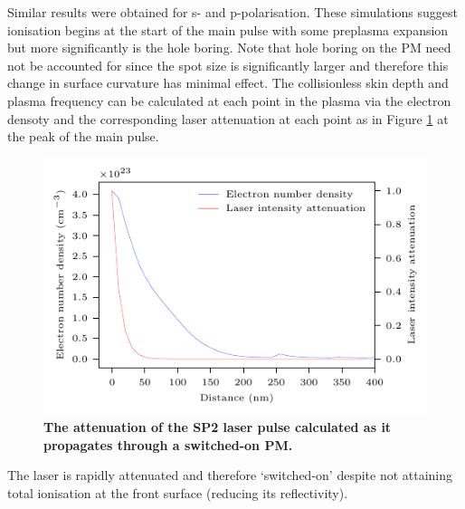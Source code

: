 Similar results were obtained for s- and p-polarisation. These simulations suggest ionisation begins at the start of the main pulse with some preplasma expansion but more significantly is the hole boring. Note that hole boring on the PM need not be accounted for since the spot size is significantly larger and therefore this change in surface curvature has minimal effect. The collisionless skin depth and plasma frequency can be calculated at each point in the plasma  via the electron densoty and the corresponding laser attenuation at each point as in Figure \ref{fig:orionpmreflection} at the peak of the main pulse.
\begin{figure}
	\centering
	\includegraphics{figures/orion/orion_PM_reflection}
	\caption[The attenuation of the SP2 laser pulse as it propagates through a switched-on PM.]{\textbf{The attenuation of the SP2 laser pulse calculated as it propagates through a switched-on PM.}}
	\label{fig:orionpmreflection}
\end{figure}
The laser is rapidly attenuated and therefore `switched-on' despite not attaining total ionisation at the front surface (reducing its reflectivity).

